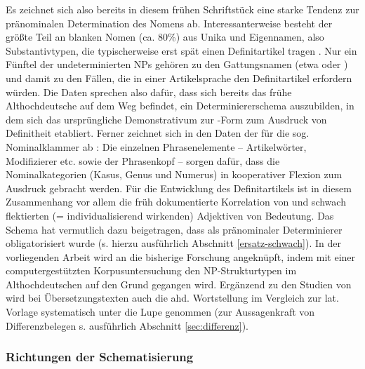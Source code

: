 Es zeichnet sich also bereits in diesem frühen Schriftstück eine starke Tendenz zur pränominalen Determination des Nomens ab. Interessanterweise besteht der größte Teil an blanken Nomen (ca. 80\%) aus Unika und Eigennamen, also Substantivtypen, die typischerweise erst spät einen Definitartikel tragen \parencite[s. z.B.][]{Schmuck2014}. Nur ein Fünftel der undeterminierten NPs gehören zu den Gattungsnamen (etwa  oder ) und damit zu den Fällen, die in einer Artikelsprache den Definitartikel erfordern würden. Die Daten sprechen also dafür, dass sich bereits das frühe Althochdeutsche auf dem Weg befindet, ein Determiniererschema auszubilden, in dem sich das ursprüngliche Demonstrativum  zur -Form zum Ausdruck von Definitheit etabliert.  Ferner zeichnet sich in den Daten der  für die sog. Nominalklammer ab \parencite[vgl. u.a.][ ]{Ronneberger-Sibold1994,Ronneberger-Sibold2010,Ronneberger-Sibold2010a,Szczepaniak2011a,Flick2018}: Die einzelnen Phrasenelemente -- Artikelwörter,  Modifizierer etc. sowie der Phrasenkopf -- sorgen dafür, dass die Nominalkategorien (Kasus, Genus und Numerus) in kooperativer Flexion zum Ausdruck gebracht werden. Für die Entwicklung des Definitartikels ist in diesem Zusammenhang vor allem die früh dokumentierte Korrelation von  und schwach flektierten (= individualisierend wirkenden) Adjektiven von Bedeutung. Das Schema hat vermutlich dazu beigetragen, dass   als pränominaler Determinierer obligatorisiert wurde (s. hierzu ausführlich Abschnitt \ref{ersatz-schwach}).  In der vorliegenden Arbeit wird an die bisherige Forschung angeknüpft, indem  mit einer computergestützten Korpusuntersuchung den NP-Strukturtypen im Althochdeutschen auf den Grund gegangen wird. Ergänzend zu den Studien von \textcite{Oubouzar1989,Oubouzar1992} wird bei Übersetzungstexten auch die ahd. Wortstellung im Vergleich zur lat. Vorlage systematisch unter die Lupe genommen (zur Aussagenkraft von Differenzbelegen s. ausführlich Abschnitt \ref{sec:differenz}).   

\subsubsection{Richtungen der Schematisierung} 

